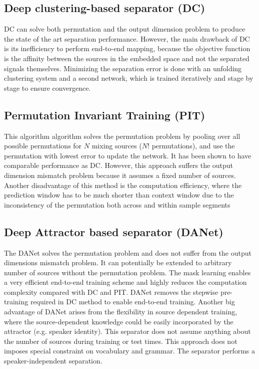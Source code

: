 \documentclass{article}
\begin{document}
\subsection{Deep clustering-based separator (DC)}
DC can solve both permutation and the output dimension problem to produce the state of the art separation performance. 
However, the main drawback of DC is its inefficiency to perform end-to-end mapping, because the objective function is the affinity between the sources in the embedded space and not the separated signals themselves. Minimizing the separation error is done with an unfolding clustering system and a second network, which is trained iteratively and stage by stage to ensure convergence.

\subsection{Permutation Invariant Training (PIT)}
This algorithm algorithm solves the permutation problem by pooling over all possible permutations for $N$ mixing sources ($N!$ permutations), and use the permutation with lowest error to update the network. It has been shown to have comparable performance as DC.  However, this approach suffers the output dimension mismatch problem because it assumes a fixed number of sources. Another disadvantage of this method is the computation efficiency, where  the prediction window has to be much shorter than context window due to the inconsistency of the permutation both across and within sample segments

\subsection{Deep Attractor based separator (DANet)}
The DANet solves the permutation problem and does not suffer from the output dimensions mismatch problem. It can potentially be extended to arbitrary number of sources without the permutation problem. The mask learning enables a very efficient end-to-end training scheme and highly reduces the computation complexity compared with DC and PIT. DANet removes the stepwise pre-training required in DC method to enable end-to-end training. Another big advantage of DANet arises from the flexibility in source dependent training, where the source-dependent knowledge could be easily incorporated by the attractor (e.g. speaker identity). 
This separator does not assume anything about the number of sources during training or test times. This approach does not imposes special constraint on vocabulary and grammar. The separator performs a speaker-independent separation.
\end{document}
